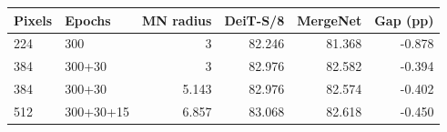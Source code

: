 \begin{tabular}{llrrrr}
\toprule
Pixels & Epochs & MN radius & DeiT-S/8 & MergeNet & Gap (pp) \\
\midrule
224 & 300 & 3 & 82.246 & 81.368 & -0.878 \\
384 & 300+30 & 3 & 82.976 & 82.582 & -0.394 \\
384 & 300+30 & 5.143 & 82.976 & 82.574 & -0.402 \\
512 & 300+30+15 & 6.857 & 83.068 & 82.618 & -0.450 \\
\bottomrule
\end{tabular}
